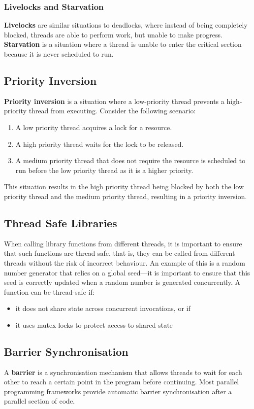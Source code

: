 \documentclass{article}
\begin{document}
\subsubsection{Livelocks and Starvation}
\textbf{Livelocks} are similar situations to deadlocks, where instead
of being completely blocked, threads are able to perform work, but
unable to make progress. \textbf{Starvation} is a situation where a
thread is unable to enter the critical section because it is never
scheduled to run.
\subsection{Priority Inversion}
\textbf{Priority inversion} is a situation where a low-priority thread
prevents a high-priority thread from executing. Consider the following
scenario:
\begin{enumerate}
    \item A low priority thread acquires a lock for a resource.
    \item A high priority thread waits for the lock to be released.
    \item A medium priority thread that does not require the resource
          is scheduled to run before the low priority thread as it is a
          higher priority.
\end{enumerate}
This situation results in the high priority thread being blocked by both
the low priority thread and the medium priority thread, resulting in a
priority inversion.
\subsection{Thread Safe Libraries}
When calling library functions from different threads, it is important
to ensure that such functions are thread safe, that is, they can be
called from different threads without the risk of incorrect behaviour.
An example of this is a random number generator that relies on a global
seed---it is important to ensure that this seed is correctly updated
when a random number is generated concurrently. A function can be
thread-safe if:
\begin{itemize}
    \item it does not share state across concurrent invocations, or if
    \item it uses mutex locks to protect access to shared state
\end{itemize}
\subsection{Barrier Synchronisation}
A \textbf{barrier} is a synchronisation mechanism that allows threads
to wait for each other to reach a certain point in the program before
continuing. Most parallel programming frameworks provide automatic
barrier synchronisation after a parallel section of code.
\end{document}
